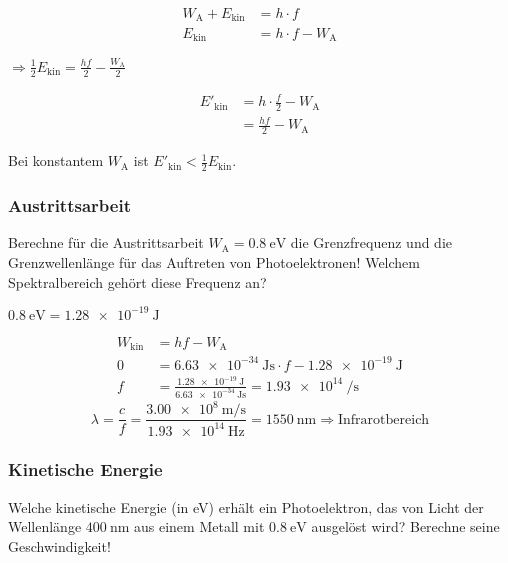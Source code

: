 \documentclass{ajc}
\begin{document}
	\begin{equation}
		\begin{split}
			W_\text{A} + E_\text{kin} &= h \cdot f \\
			E_\text{kin} &= h \cdot f - W_\text{A}
		\end{split}
	\end{equation}
	
	$\Rightarrow \frac{1}{2}E_\text{kin} = \frac{hf}{2} - \frac{W_\text{A}}{2}$
	
	\begin{equation}
		\begin{split}
			E'_\text{kin} &= h \cdot \frac{f}{2} - W_\text{A} \\
						  &= \frac{hf}{2} - W_\text{A}
		\end{split}
	\end{equation}
	
	
	
	Bei konstantem $W_\text{A}$ ist $E'_\text{kin} < \frac{1}{2}E_\text{kin}$.
	
	\subsubsection{Austrittsarbeit}
	Berechne für die Austrittsarbeit $W_\text{A} = \SI{0,8}{\eV}$ die Grenzfrequenz und die Grenzwellenlänge für das Auftreten von Photoelektronen! Welchem Spektralbereich gehört diese Frequenz an?
	
	$\SI{0,8}{\eV} = \SI{1,28e-19}{\J}$
	
	\begin{equation}
		\begin{split}
			W_\text{kin} &= hf - W_\text{A} \\
			0 &= \SI{6,63e-34}{\J\s} \cdot f - \SI{1,28e-19}{\J} \\
			f &= \frac{\SI{1,28e-19}{\J}}{\SI{6,63e-34}{\J\s}} = \SI{1,93e14}{\per\s}
		\end{split}
	\end{equation}
	\begin{equation}
		\lambda = \frac{c}{f} = \frac{\SI{3,00e8}{\m\per\s}}{\SI{1,93e14}{\Hz}} = \SI{1550}{\nm} \Rightarrow \text{Infrarotbereich}
	\end{equation}
	
	\subsubsection{Kinetische Energie}
	Welche kinetische Energie (in eV) erhält ein Photoelektron, das von Licht der Wellenlänge $\SI{400}{\nm}$ aus einem Metall mit $\SI{0.8}{\eV}$ ausgelöst wird? Berechne seine Geschwindigkeit!
	
\end{document}
